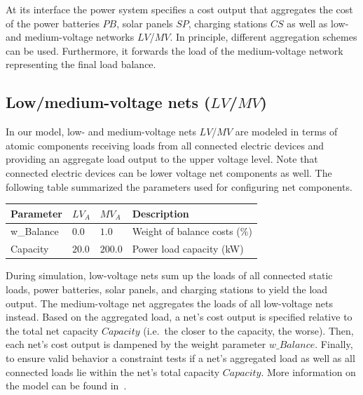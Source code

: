 At its interface the power system specifies a cost output that aggregates the cost of the power batteries $PB$, solar panels $SP$, charging stations $CS$ as well as low- and medium-voltage networks $LV$/$MV$. In principle, different aggregation schemes can be used. Furthermore, it forwards the load of the medium-voltage network representing the final load balance.

\subsection{Low/medium-voltage nets ($LV$/$MV$)}

In our model, low- and medium-voltage nets $LV$/$MV$ are modeled in terms of atomic components receiving loads from all connected electric devices and providing an aggregate load output to the upper voltage level. Note that connected electric devices can be lower voltage net components as well. The following table summarized the parameters used for configuring net components.

\begin{table}[h]
	\renewcommand{\arraystretch}{1.3}
	\centering
	\begin{tabularx}{\columnwidth}{lllX}
		\hline
		\textbf{Parameter}   & \textbf{$LV_{A}$} & \textbf{$MV_{A}$}  & Description \\ \hline
		w\_Balance       & $0.0$ & $1.0$ & Weight of balance costs (\%) \\  
		Capacity          & $20.0$ & $200.0$ & Power load capacity (kW)     \\ \hline
	\end{tabularx}
\end{table}

During simulation, low-voltage nets sum up the loads of all connected static loads, power batteries, solar panels, and charging stations to yield the load output. The medium-voltage net aggregates the loads of all low-voltage nets instead. Based on the aggregated load, a net's cost output is specified relative to the total net capacity $Capacity$ (i.e.\ the closer to the capacity, the worse). Then, each net's cost output is dampened by the weight parameter $w\_Balance$. Finally, to ensure valid behavior a constraint tests if a net's aggregated load as well as all connected loads lie within the net's total capacity $Capacity$. More information on the model can be found in~\cite{hackenberg2012applying}.

